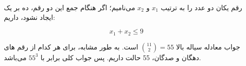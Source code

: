 \p
	رقم یکان دو عدد را به ترتیب 
	$x_1$
	و
	$x_2$
	می‌نامیم؛
	اگر هنگام جمع این دو رقم، ده بر یک ایجاد نشود، داریم:
	
	$$x_1 + x_2 \leq 9$$
	
	جواب معادله سیاله بالا
	$\binom{11}{2} = 55$
	است. به طور مشابه،
	برای هر کدام از رقم های دهگان و صدگان، 55 حالت داریم. پس جواب کلی برابر با
	$55^3$
	می‌باشد.